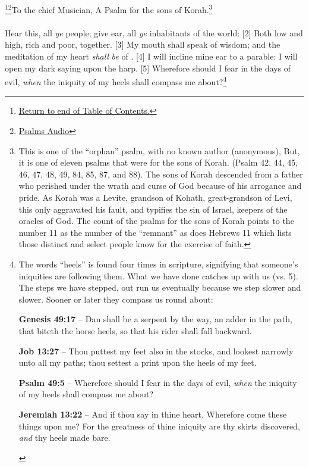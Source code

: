     
\footnote{\textcolor[cmyk]{0.99998,1,0,0}{\hyperlink{TOC}{Return to end of Table of Contents.}}}\footnote{\href{https://audiobible.com/bible/psalms_49.html}{\textcolor[cmyk]{0.99998,1,0,0}{Psalms Audio}}}\textcolor[cmyk]{0.99998,1,0,0}{To the chief Musician, A Psalm for the sons of Korah.}\footnote{This is one of the ``orphan'' psalm, with no known author (anonymous), But, it is one of eleven psalms that were for the sons of Korah. (Psalm 42, 44, 45, 46, 47, 48, 49, 84, 85, 87, and 88). The sons of Korah descended from a father who perished under the wrath and curse of God because of his arrogance and pride.   As Korah was a Levite, grandson of Kohath, great-grandson of Levi, this only aggravated his fault, and typifies the sin of Israel, keepers of the oracles of God. \cite{Phillips2001ExploringPsalms1} The count of the psalms for the sons of Korah points to the number 11 as the number of the ``remnant'' as does Hebrews 11 which lists those distinct and select people know for the exercise of faith.}\\
\\
\textcolor[cmyk]{0.99998,1,0,0}{Hear this, all \emph{ye} people; give ear, all \emph{ye} inhabitants of the world:}
[2] \textcolor[cmyk]{0.99998,1,0,0}{Both low and high, rich and poor, together.}
[3] \textcolor[cmyk]{0.99998,1,0,0}{My mouth shall speak of wisdom; and the meditation of my heart \emph{shall} \emph{be} of .}
[4] \textcolor[cmyk]{0.99998,1,0,0}{I will incline mine ear to a parable: I will open my dark saying upon the harp.}
[5] \textcolor[cmyk]{0.99998,1,0,0}{Wherefore should I fear in the days of evil, \emph{when} the iniquity of my heels shall compass me about?}\footnote{The words ``heels'' is found four times in scripture, signifying that someone’s iniquities are following them. What we have done catches up with us (vs. 5). The steps we have stepped, out run us eventually because we step slower and slower. Sooner or later they compass us round about: \cite{Ruckman1992Psalms}
\begin{compactenum}
\item \textbf{Genesis 49:17} -- Dan shall be a serpent by the way, an adder in the path, that biteth the horse heels, so that his rider shall fall backward.
\item \textbf{Job 13:27} -- Thou puttest my feet also in the stocks, and lookest narrowly unto all my paths; thou settest a print upon the heels of my feet.
\item \textbf{Psalm 49:5} -- Wherefore should I fear in the days of evil, \emph{when} the iniquity of my heels shall compass me about?
\item \textbf{Jeremiah 13:22} -- And if thou say in thine heart, Wherefore come these things upon me? For the greatness of thine iniquity are thy skirts discovered, \emph{and} thy heels made bare.
\end{compactenum} }
